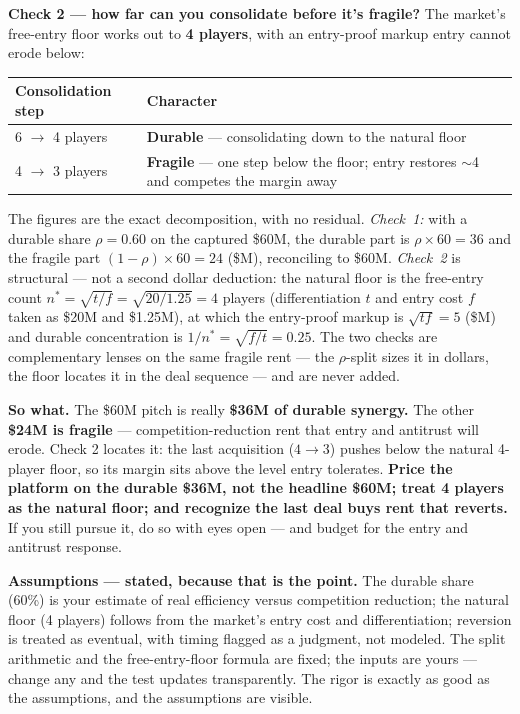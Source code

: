 \documentclass[11pt]{article}
\newcommand{\durable}{\textcolor{creoaccent}{\textbf{Durable}}}
\newcommand{\fragile}{\textcolor{gray!55!black}{\textbf{Fragile}}}
\begin{document}
\textbf{Check 2 --- how far can you consolidate before it's fragile?} The market's free-entry
floor works out to \textbf{4 players}, with an entry-proof markup entry cannot erode below:
\begin{center}
\renewcommand{\arraystretch}{1.25}\small
\begin{tabular}{l l}
\toprule
\textbf{Consolidation step} & \textbf{Character} \\
\midrule
6 $\rightarrow$ 4 players & \durable{} --- consolidating down to the natural floor \\
4 $\rightarrow$ 3 players & \fragile{} --- one step below the floor; entry restores $\sim$4 and competes the margin away \\
\bottomrule
\end{tabular}
\end{center}

{\footnotesize The figures are the exact decomposition, with no residual. \emph{Check~1:} with a
durable share $\rho=0.60$ on the captured \$60M, the durable part is $\rho\times 60=36$ and the
fragile part $(1-\rho)\times 60=24$ (\$M), reconciling to \$60M. \emph{Check~2} is structural ---
not a second dollar deduction: the natural floor is the free-entry count
$n^{*}=\sqrt{t/f}=\sqrt{20/1.25}=4$ players (differentiation $t$ and entry cost $f$ taken as \$20M
and \$1.25M), at which the entry-proof markup is $\sqrt{tf}=5$ (\$M) and durable concentration is
$1/n^{*}=\sqrt{f/t}=0.25$. The two checks are complementary lenses on the same fragile rent --- the
$\rho$-split sizes it in dollars, the floor locates it in the deal sequence --- and are never added.}

\begin{sowhat}
\textbf{So what.} The \$60M pitch is really \textbf{\$36M of durable synergy.} The other
\textbf{\$24M is fragile} --- competition-reduction rent that entry and antitrust will erode. Check
2 locates it: the last acquisition (\mbox{$4\!\rightarrow\!3$}) pushes below the natural 4-player
floor, so its margin sits above the level entry tolerates. \textbf{Price the platform on the
durable \$36M, not the headline \$60M; treat 4 players as the natural floor; and recognize the last
deal buys rent that reverts.} If you still pursue it, do so with eyes open --- and budget for the
entry and antitrust response.
\end{sowhat}

\textbf{Assumptions --- stated, because that is the point.} The durable share (60\%) is your
estimate of real efficiency versus competition reduction; the natural floor (4 players) follows
from the market's entry cost and differentiation; reversion is treated as eventual, with timing
flagged as a judgment, not modeled. The split arithmetic and the free-entry-floor formula are
fixed; the inputs are yours --- change any and the test updates transparently. The rigor is exactly
as good as the assumptions, and the assumptions are visible.
\end{document}
